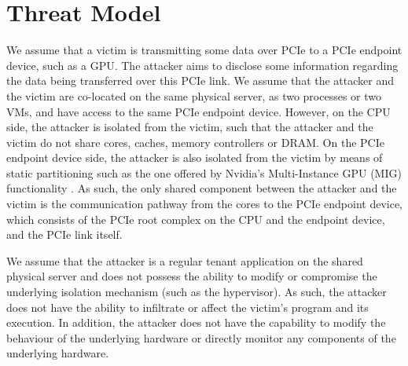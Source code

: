 \section{Threat Model}
\label{sec:interconnect-sc-threat-model}

We assume that a victim is transmitting some data over PCIe to a PCIe endpoint device, such as a GPU.
The attacker aims to disclose some information regarding the data being transferred over this PCIe link.
We assume that the attacker and the victim are co-located on the same physical server, as two processes or two VMs, and have access to the same PCIe endpoint device.
However, on the CPU side, the attacker is isolated from the victim, such that the attacker and the victim do not share cores, caches, memory controllers or DRAM.
On the PCIe endpoint device side, the attacker is also isolated from the victim by means of static partitioning such as the one offered by Nvidia's Multi-Instance GPU (MIG) functionality \cite{nvidia_mig_guide}.
As such, the only shared component between the attacker and the victim is the communication pathway from the cores to the PCIe endpoint device, which consists of the PCIe root complex on the CPU and the endpoint device, and the PCIe link itself.

We assume that the attacker is a regular tenant application on the shared physical server and does not possess the ability to modify or compromise the underlying isolation mechanism (such as the hypervisor).
As such, the attacker does not have the ability to infiltrate or affect the victim's program and its execution.
In addition, the attacker does not have the capability to modify the behaviour of the underlying hardware or directly monitor any components of the underlying hardware.

\endinput

Talk about superuser privilege for CPU store ops.